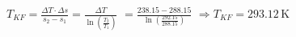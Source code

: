 \( T_{KF} = \frac{\Delta T \cdot \Delta s}{s_2 - s_1} = \frac{\Delta T}{\ln \left( \frac{T_2}{T_1} \right)} \)  
\( = \frac{238.15 - 288.15}{\ln \left( \frac{292.15}{288.15} \right)} \)  
\( \Rightarrow T_{KF} = 293.12 \, \text{K} \)